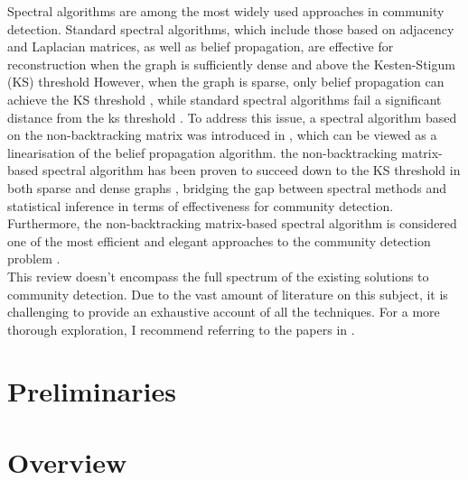 Spectral algorithms are among the most widely used approaches in community detection. Standard spectral algorithms, which include those based on adjacency and Laplacian matrices, as well as belief propagation, are effective for reconstruction when the graph is sufficiently dense and above the Kesten-Stigum (KS) threshold \cite{standard_spec_in_dense}However, when the graph is sparse, only belief propagation can achieve the KS threshold \cite{firstpaper}, while standard spectral algorithms fail a significant distance from the ks threshold \cite{standard_spec_fail}. To address this issue, a spectral algorithm based on the non-backtracking matrix was introduced in \cite{the_non_backtracking}, which can be viewed as a linearisation of the belief propagation algorithm\cite{as15c}. the non-backtracking matrix-based spectral algorithm  has been proven to succeed down to the KS threshold in both sparse and dense graphs  \cite{blm15}, bridging the gap between spectral methods and statistical inference in terms of effectiveness for community detection. Furthermore, the non-backtracking matrix-based spectral algorithm is considered one of the most efficient and elegant approaches to the community detection problem \cite{the_non_backtracking} \cite{TheConjecture}.\\
This review doesn't encompass the full spectrum of the existing solutions to community detection. Due to the vast amount of literature on this subject, it is challenging to provide an exhaustive account of all the techniques. For a more thorough exploration, I recommend referring to the papers in \cite{TheConjecture} \cite{comm_dete_in_graphs} \cite{userguide}.
\section{Preliminaries}
\section{Overview}

